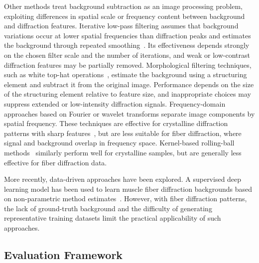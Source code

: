 \documentclass[iucr]{iucrjournals}
\begin{document}
Other methods treat background subtraction as an image processing problem, exploiting differences in spatial scale or frequency content between background and diffraction features. Iterative low-pass filtering assumes that background variations occur at lower spatial frequencies than diffraction peaks and estimates the background through repeated smoothing~\cite{IvanovaMakowski1998}. Its effectiveness depends strongly on the chosen filter scale and the number of iterations, and weak or low-contrast diffraction features may be partially removed. Morphological filtering techniques, such as white top-hat operations~\cite{GonzalezWoodsDIP4e}, estimate the background using a structuring element and subtract it from the original image. Performance depends on the size of the structuring element relative to feature size, and inappropriate choices may suppress extended or low-intensity diffraction signals. Frequency-domain approaches based on Fourier or wavelet transforms separate image components by spatial frequency. These techniques are effective for crystalline diffraction patterns with sharp features~\cite{PolarBackground2024, WaveletBiomedOptExpress2021, renedecotret2017baseline}, but are less suitable for fiber diffraction, where signal and background overlap in frequency space. Kernel-based rolling-ball methods~\cite{Sternberg1983} similarly perform well for crystalline samples, but are generally less effective for fiber diffraction data.

More recently, data-driven approaches have been explored. A supervised deep learning model has been used to learn muscle fiber diffraction backgrounds based on non-parametric method estimates~\cite{ArangurenCarmona2020}. However, with fiber diffraction patterns, the lack of ground-truth background and the difficulty of generating representative training datasets limit the practical applicability of such approaches.

\subsection{Evaluation Framework}
\label{sec:evaluation_framework}
\end{document}

